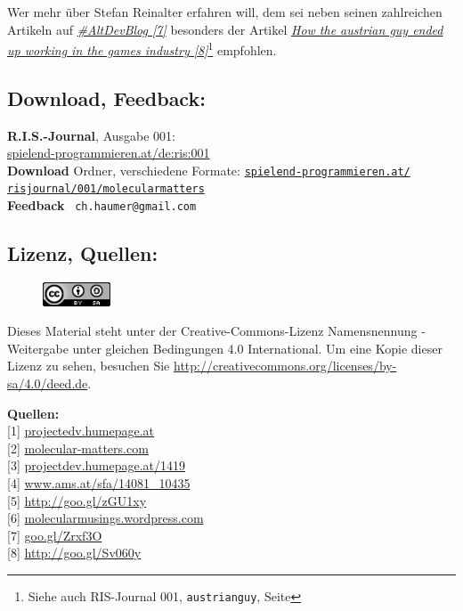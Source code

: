 Wer mehr über Stefan Reinalter erfahren will, dem sei neben seinen zahlreichen Artikeln auf \href{http://www.altdevblogaday.com/author/stefan-reinalter/}{\textit{\#AltDevBlog [7]}} besonders der Artikel \href{http://www.altdevblogaday.com/2011/09/27/how-the-austrian-guy-ended-up-working-in-the-games-industry/}{\textit{How the austrian guy ended up working in the games industry [8]}}\footnote{Siehe auch RIS-Journal 001, \texttt{austrianguy}, Seite \pageref{austrianguy}} empfohlen.

\subsection*{Download, Feedback:}
\textbf{R.I.S.-Journal}, Ausgabe 001: \\
\href{http://spielend-programmieren.at/de:ris:001}{spielend-programmieren.at/de:ris:001}\\
\textbf{Download} Ordner, verschiedene Formate: \href{http://spielend-programmieren.at/risjournal/001/molecularmatters}{\texttt{spielend-programmieren.at/\\risjournal/001/molecularmatters}} \\
\textbf{Feedback} \Letter\ \texttt{ch.haumer@gmail.com} \\

\subsection*{Lizenz, Quellen:}

\begin{figure}
\includegraphics[width=2cm]{molecularmatters/ccbysa88x31.png}
\end{figure}
Dieses Material steht unter der Creative-Commons-Lizenz Namensnennung - Weitergabe unter gleichen Bedingungen 4.0 International. Um eine Kopie dieser Lizenz zu sehen, besuchen Sie \url{http://creativecommons.org/licenses/by-sa/4.0/deed.de}.

\textbf{Quellen:} \\
{[}1{]} \href{http://projectdev.humepage.at/}{projectedv.humepage.at} \\
{[}2{]} \href{http://www.molecular-matters.com/}{molecular-matters.com} \\
{[}3{]} \href{http://projectdev.humepage.at/1419}{projectdev.humepage.at/1419} \\
{[}4{]} \href{http://www.ams.at/sfa/14081_10435.html}{www.ams.at/sfa/14081\_10435} \\
{[}5{]} \href{https://www.gruenderservice.at/Content.Node/gruenden/Jungunternehmerfoerderungen.html}{http://goo.gl/zGU1xy} \\
{[}6{]} \href{http://molecularmusings.wordpress.com/}{molecularmusings.wordpress.com} \\
{[}7{]} \href{http://www.altdevblogaday.com/author/stefan-reinalter/}{goo.gl/Zrxf3O} \\
{[}8{]} \href{http://www.altdevblogaday.com/2011/09/27/how-the-austrian-guy-ended-up-working-in-the-games-industry/}{http://goo.gl/Sv060y} 



